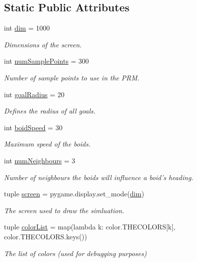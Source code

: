 \subsection*{Static Public Attributes}
\begin{DoxyCompactItemize}
\item 
int \hyperlink{classconfiguration_1_1Configuration_af63a65a65716f36cb11afd4d0e7f318f}{dim} = 1000
\begin{DoxyCompactList}\small\item\em Dimensions of the screen. \end{DoxyCompactList}\item 
int \hyperlink{classconfiguration_1_1Configuration_a35685f1f81ce810f4a429654c6b27334}{num\-Sample\-Points} = 300
\begin{DoxyCompactList}\small\item\em Number of sample points to use in the P\-R\-M. \end{DoxyCompactList}\item 
int \hyperlink{classconfiguration_1_1Configuration_a1a5fee18f20950a467d1b94d4d276c78}{goal\-Radius} = 20
\begin{DoxyCompactList}\small\item\em Defines the radius of all goals. \end{DoxyCompactList}\item 
int \hyperlink{classconfiguration_1_1Configuration_a5062047bc933b81cbbaa841e20cb2a67}{boid\-Speed} = 30
\begin{DoxyCompactList}\small\item\em Maximum speed of the boids. \end{DoxyCompactList}\item 
int \hyperlink{classconfiguration_1_1Configuration_a7eef6f8f2eb6d4a8fa4a45ddf9f6e1ba}{num\-Neighbours} = 3
\begin{DoxyCompactList}\small\item\em Number of neighbours the boids will influence a boid's heading. \end{DoxyCompactList}\item 
tuple \hyperlink{classconfiguration_1_1Configuration_a04b8c98906296ee65625d1472e037a75}{screen} = pygame.\-display.\-set\-\_\-mode(\hyperlink{classconfiguration_1_1Configuration_af63a65a65716f36cb11afd4d0e7f318f}{dim})
\begin{DoxyCompactList}\small\item\em The screen used to draw the simluation. \end{DoxyCompactList}\item 
tuple \hyperlink{classconfiguration_1_1Configuration_a2140643801852e373bfddf9945cf26f8}{color\-List} = map(lambda k\-: color.\-T\-H\-E\-C\-O\-L\-O\-R\-S\mbox{[}k\mbox{]}, color.\-T\-H\-E\-C\-O\-L\-O\-R\-S.\-keys())
\begin{DoxyCompactList}\small\item\em The list of colors (used for debugging purposes) \end{DoxyCompactList}\end{DoxyCompactItemize}


